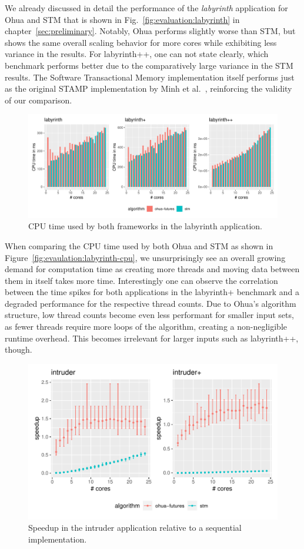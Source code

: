 We already discussed in detail the performance of the \emph{labyrinth} application for Ohua and STM that is shown in Fig.~\ref{fig:evaluation:labyrinth} in chapter~\ref{sec:preliminary}.
Notably, Ohua performs slightly worse than STM, but shows the same overall scaling behavior for more cores while exhibiting less variance in the results.
For labyrinth++, one can not state clearly, which benchmark performs better due to the comparatively large variance in the STM results.
The Software Transactional Memory implementation itself performs just as the original STAMP implementation by Minh et al.~\cite{minh2008stamp}, reinforcing the validity of our comparison.

\begin{figure}
    \centering
    \includegraphics[width=\textwidth,keepaspectratio]{gfx/results/cpu_labyrinth_comb}
    \caption{CPU time used by both frameworks in the labyrinth application.}%
    \label{fig:evaluation:labyrinth-cpu}
\end{figure}

When comparing the CPU time used by both Ohua and STM as shown in Figure~\ref{fig:evaulation:labyrinth-cpu}, we unsurprisingly see an overall growing demand for computation time as creating more threads and moving data between them in itself takes more time.
Interestingly one can observe the correlation between the time spikes for both applications in the labyrinth+ benchmark and a degraded performance for the respective thread counts.
Due to Ohua's algorithm structure, low thread counts become even less performant for smaller input sets, as fewer threads require more loops of the algorithm, creating a non-negligible runtime overhead.
This becomes irrelevant for larger inputs such as labyrinth++, though.


\begin{figure}
    \centering
    \includegraphics[width=.66\textwidth,keepaspectratio]{gfx/results/intruder_comb}
    \caption{Speedup in the intruder application relative to a sequential implementation.}%
    \label{fig:evaluation:intruder}
\end{figure}

